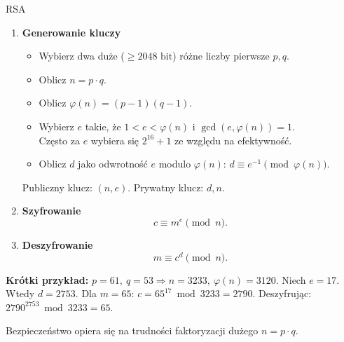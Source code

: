 \documentclass[polish,envcountsect,10pt]{beamer}
\begin{document}
\begin{frame}{RSA}
        \begin{enumerate}
            \item \textbf{Generowanie kluczy}
                \begin{itemize}
                    \item Wybierz dwa duże ($\ge 2048 \text{ bit}$) różne liczby pierwsze \(p,q\).
                    \item Oblicz \(n=p\cdot q\).
                    \item Oblicz \(\varphi(n)=(p-1)(q-1)\).
                    \item Wybierz \(e\) takie, że \(1<e<\varphi(n)\) i \(\gcd(e,\varphi(n))=1\).
                    \\ Często za \(e\) wybiera się \(2^{16}+1\) ze względu na efektywność.
                    \item Oblicz \(d\) jako odwrotność \(e\) modulo \(\varphi(n)\): \(d\equiv e^{-1}\pmod{\varphi(n)}\).
                \end{itemize}
                Publiczny klucz: \((n,e)\). Prywatny klucz: \(d, n\).
            \item \textbf{Szyfrowanie}
                \[
                    c \equiv m^{e} \pmod{n}.
                \]
            \item \textbf{Deszyfrowanie}
                \[
                    m \equiv c^{d} \pmod{n}.
                \]
        \end{enumerate}

        \textbf{Krótki przykład:} \(p=61,\ q=53\Rightarrow n=3233,\ \varphi(n)=3120\). Niech \(e=17\). Wtedy \(d=2753\).
        Dla \(m=65\): \(c=65^{17}\bmod 3233=2790\). Deszyfrując: \(2790^{2753}\bmod 3233=65\).


        Bezpieczeństwo opiera się na trudności faktoryzacji dużego $n=p\cdot q$.
\end{frame}
%   
\end{document}
